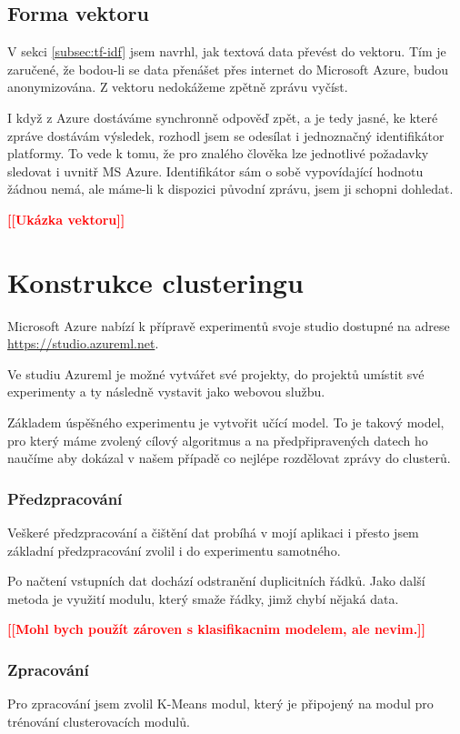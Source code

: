 \documentclass[thesis=M,czech]{FITthesis}[2012/10/20]
\newcommand{\todo}[1]{\textcolor{red}{\textbf{[[#1]]}}}
\begin{document}
		\subsection{Forma vektoru}
		V sekci \ref{subsec:tf-idf} jsem navrhl, jak textová data převést do vektoru. Tím je zaručené, že bodou-li se data přenášet přes internet do Microsoft Azure, budou anonymizována. Z vektoru nedokážeme zpětně zprávu vyčíst.
		
		I když z Azure dostáváme synchronně odpověď zpět, a je tedy jasné, ke které zpráve dostávám výsledek, rozhodl jsem se odesílat i jednoznačný identifikátor platformy. To vede k tomu, že pro znalého člověka lze jednotlivé požadavky sledovat i uvnitř MS Azure. Identifikátor sám o sobě vypovídající hodnotu žádnou nemá, ale máme-li k dispozici původní zprávu, jsem ji schopni dohledat.
		
		\todo{Ukázka vektoru}
		
	\section{Konstrukce clusteringu}
		\label{sec:construc_clustering}
		Microsoft Azure nabízí k přípravě experimentů svoje studio dostupné na adrese \url{https://studio.azureml.net}.
		
		Ve studiu Azureml je možné vytvářet své projekty, do projektů umístit své experimenty a ty následně vystavit jako webovou službu.
		
		Základem úspěšného experimentu je vytvořit učící model. To je takový model, pro který máme zvolený cílový algoritmus a na předpřipravených datech ho naučíme aby dokázal v našem případě co nejlépe rozdělovat zprávy do clusterů.
		
		\subsubsection{Předzpracování}
		Veškeré předzpracování a čištění dat probíhá v mojí aplikaci i přesto jsem základní předzpracování zvolil i do experimentu samotného.
		
		Po načtení vstupních dat dochází odstranění duplicitních řádků. Jako další metoda je využití modulu, který smaže řádky, jimž chybí nějaká data.
		
		\todo{Mohl bych použít zároven s klasifikacnim modelem, ale nevim.}
		\subsubsection{Zpracování}
		Pro zpracování jsem zvolil K-Means modul, který je připojený na modul pro trénování clusterovacích modulů.
		
\end{document}
